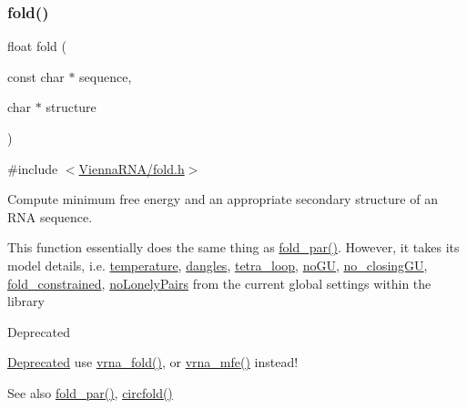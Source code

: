 \subsubsection{\texorpdfstring{fold()}{fold()}}
{\footnotesize\ttfamily float fold (\begin{DoxyParamCaption}\item[{const char $\ast$}]{sequence,  }\item[{char $\ast$}]{structure }\end{DoxyParamCaption})}



{\ttfamily \#include $<$\hyperlink{fold_8h}{Vienna\+R\+N\+A/fold.\+h}$>$}



Compute minimum free energy and an appropriate secondary structure of an R\+NA sequence. 

This function essentially does the same thing as \hyperlink{group__mfe__fold__single_ga2bc41df5d71fee6fd8da9904ee65d8fb}{fold\+\_\+par()}. However, it takes its model details, i.\+e. \hyperlink{group__model__details_gab4b11c8d9c758430960896bc3fe82ead}{temperature}, \hyperlink{group__model__details_ga72b511ed1201f7e23ec437e468790d74}{dangles}, \hyperlink{group__model__details_ga4f6265bdf0ead7ff4628a360adbfd77e}{tetra\+\_\+loop}, \hyperlink{group__model__details_gabf380d09e4f1ab94fc6af57cf0ad5d32}{no\+GU}, \hyperlink{group__model__details_gaa8d1c7b92489179e1eafa562b7bdd259}{no\+\_\+closing\+GU}, \hyperlink{fold__vars_8h_a0afc287c2464866d94858c39175154af}{fold\+\_\+constrained}, \hyperlink{group__model__details_ga097eccaabd6ae8b4fef83cccff85bb5d}{no\+Lonely\+Pairs} from the current global settings within the library

\begin{DoxyRefDesc}{Deprecated}
\item[\hyperlink{deprecated__deprecated000071}{Deprecated}]use \hyperlink{group__mfe__fold__single_ga29a33b2895f4e67b0480271ff289afdc}{vrna\+\_\+fold()}, or \hyperlink{group__mfe__fold_gabd3b147371ccf25c577f88bbbaf159fd}{vrna\+\_\+mfe()} instead!\end{DoxyRefDesc}


\begin{DoxySeeAlso}{See also}
\hyperlink{group__mfe__fold__single_ga2bc41df5d71fee6fd8da9904ee65d8fb}{fold\+\_\+par()}, \hyperlink{group__mfe__fold__single_ga4ac63ab3e8d9a80ced28b8052d94e423}{circfold()}
\end{DoxySeeAlso}

